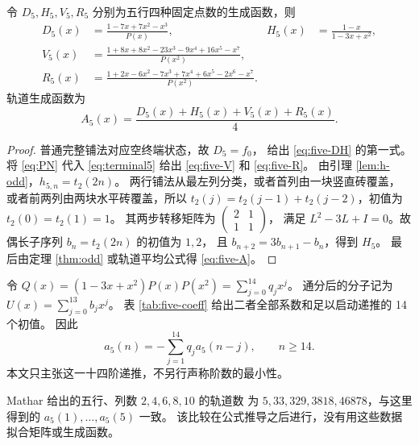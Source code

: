 \begin{theorem}[五行显式公式]\label{thm:five}
令 $D_5,H_5,V_5,R_5$ 分别为五行四种固定点数的生成函数，则
\begin{align}
 D_5(x)&=\frac{1-7x+7x^2-x^3}{P(x)},&
 H_5(x)&=\frac{1-x}{1-3x+x^2},\label{eq:five-DH}\\
 V_5(x)&=\frac{1+8x+8x^2-23x^3-9x^4+16x^5-x^7}{P(x^2)},\label{eq:five-V}\\
 R_5(x)&=\frac{1+2x-6x^2-7x^3+7x^4+6x^5-2x^6-x^7}{P(x^2)}.\label{eq:five-R}
\end{align}
轨道生成函数为
\begin{equation}\label{eq:five-A}
 A_5(x)=\frac{D_5(x)+H_5(x)+V_5(x)+R_5(x)}4.
\end{equation}
\end{theorem}
\begin{proof}
普通完整铺法对应空终端状态，故 $D_5=f_0$，
给出 \eqref{eq:five-DH} 的第一式。
将 \eqref{eq:PN} 代入 \eqref{eq:terminal5} 给出
\eqref{eq:five-V} 和 \eqref{eq:five-R}。
由引理 \ref{lem:h-odd}，$h_{5,n}=t_2(2n)$。
两行铺法从最左列分类，或者首列由一块竖直砖覆盖，
或者前两列由两块水平砖覆盖，所以
$t_2(j)=t_2(j-1)+t_2(j-2)$，初值为 $t_2(0)=t_2(1)=1$。
其两步转移矩阵为
$\left(\begin{smallmatrix}2&1\\1&1\end{smallmatrix}\right)$，
满足 $L^2-3L+I=0$。故偶长子序列 $b_n=t_2(2n)$ 的初值为 $1,2$，
且 $b_{n+2}=3b_{n+1}-b_n$，得到 $H_5$。
最后由定理 \ref{thm:odd} 或轨道平均公式得 \eqref{eq:five-A}。
\end{proof}

令 $Q(x)=(1-3x+x^2)P(x)P(x^2)=\sum_{j=0}^{14}q_jx^j$。
通分后的分子记为 $U(x)=\sum_{j=0}^{13}b_jx^j$。
表 \ref{tab:five-coeff} 给出二者全部系数和足以启动递推的 14 个初值。
因此
\begin{equation}\label{eq:rec5}
 a_5(n)=-\sum_{j=1}^{14}q_j a_5(n-j),\qquad n\ge14.
\end{equation}
本文只主张这一十四阶递推，不另行声称阶数的最小性。



Mathar \cite[表 12]{mathar2013} 给出的五行、列数 $2,4,6,8,10$ 的轨道数
为 $5,33,329,3818,46878$，与这里得到的 $a_5(1),\ldots,a_5(5)$ 一致。
该比较在公式推导之后进行，没有用这些数据拟合矩阵或生成函数。
